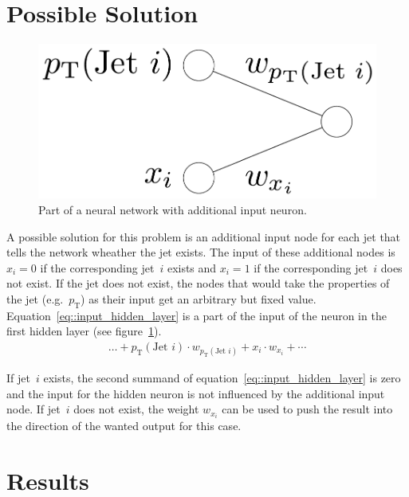 \documentclass[12pt,a4paper]{article}
\begin{document}
\section{Possible Solution}
\label{sec::Possible_solution}

\begin{figure}
\begin{center}
\includegraphics[scale=0.4]{NN_picture_2.pdf}
\caption{Part of a neural network with additional input neuron.}
\label{fig::NN_picture_2}
\end{center}
\end{figure}

A possible solution for this problem is an additional input node for each jet that tells the network wheather the jet exists. The input of these additional nodes is $x_i = 0$ if the corresponding jet~$i$ exists and $x_i = 1$ if the corresponding jet~$i$ does not exist. If the jet does not exist, the nodes that would take the properties of the jet (e.g.\ $p_\text{T}$) as their input get an arbitrary but fixed value. Equation~\eqref{eq::input_hidden_layer} is a part of the input of the neuron in the first hidden layer (see figure~\ref{fig::NN_picture_2}).
\begin{align}
\dots + p_\text{T}(\text{Jet }i) \cdot w_{p_\text{T}(\text{Jet }i)} + x_i \cdot w_{x_i} + \dotsb \label{eq::input_hidden_layer}
\end{align}

If jet~$i$ exists, the second summand of equation~\eqref{eq::input_hidden_layer} is zero and the input for the hidden neuron is not influenced by the additional input node. If jet~$i$ does not exist, the weight $w_{x_i}$ can be used to push the result into the direction of the wanted output for this case.


\section{Results}
\end{document}
